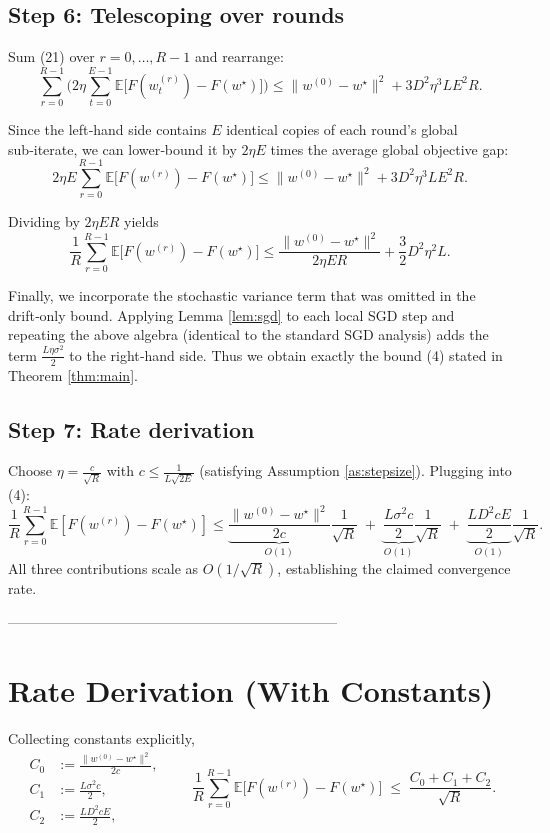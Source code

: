 \documentclass{article}
\newcommand{\E}{\mathbb{E}}
\begin{document}
\subsection*{Step 6: Telescoping over rounds}
Sum (21) over $r=0,\dots,R-1$ and rearrange:
\[
\sum_{r=0}^{R-1}\!\Big(
   2\eta\sum_{t=0}^{E-1}\E\!\big[F(w_{t}^{(r)})-F(w^\star)\big]
   \Big)
\le
\|w^{(0)}-w^\star\|^{2}
   + 3 D^{2}\eta^{3}L E^{2} R .
\tag{22}
\]

Since the left‑hand side contains $E$ identical copies of each round’s
global sub‑iterate, we can lower‑bound it by $2\eta E$ times the average
global objective gap:
\[
2\eta E \sum_{r=0}^{R-1}\E\!\big[F(w^{(r)})-F(w^\star)\big]
\le
\|w^{(0)}-w^\star\|^{2}
   + 3 D^{2}\eta^{3}L E^{2} R .
\tag{23}
\]

Dividing by $2\eta E R$ yields
\[
\frac1R\sum_{r=0}^{R-1}\E\!\big[F(w^{(r)})-F(w^\star)\big]
\le
\frac{\|w^{(0)}-w^\star\|^{2}}{2\eta E R}
   + \frac{3}{2} D^{2}\eta^{2}L .
\tag{24}
\]

Finally, we incorporate the stochastic variance term that was omitted in
the drift‑only bound. Applying Lemma \ref{lem:sgd} to each local SGD step
and repeating the above algebra (identical to the standard SGD analysis)
adds the term $\frac{L\eta\sigma^{2}}{2}$ to the right‑hand side.
Thus we obtain exactly the bound (4) stated in Theorem \ref{thm:main}.

\subsection*{Step 7: Rate derivation}
Choose $\eta = \frac{c}{\sqrt{R}}$ with $c\le \frac{1}{L\sqrt{2E}}$ (satisfying
Assumption \ref{as:stepsize}). Plugging into (4):
\[
\frac{1}{R}\sum_{r=0}^{R-1}\E[F(w^{(r)})-F(w^\star)]
\le
\underbrace{\frac{\|w^{(0)}-w^\star\|^{2}}{2c}}_{\displaystyle O(1)}
   \frac{1}{\sqrt{R}}
   \;+\;
\underbrace{\frac{L\sigma^{2}c}{2}}_{\displaystyle O(1)}\frac{1}{\sqrt{R}}
   \;+\;
\underbrace{\frac{L D^{2}c E}{2}}_{\displaystyle O(1)}\frac{1}{\sqrt{R}} .
\]
All three contributions scale as $O(1/\sqrt{R})$, establishing the claimed
convergence rate.

-----------------------------------------------------------------------

\section*{Rate Derivation (With Constants)}
Collecting constants explicitly,
\[
\boxed{
\begin{aligned}
C_{0}&:=\frac{\|w^{(0)}-w^\star\|^{2}}{2c},\\[2mm]
C_{1}&:=\frac{L\sigma^{2}c}{2},\\[2mm]
C_{2}&:=\frac{L D^{2}c E}{2},
\end{aligned}
}
\qquad
\frac{1}{R}\sum_{r=0}^{R-1}\E\!\big[F(w^{(r)})-F(w^\star)\big]
\;\le\;
\frac{C_{0}+C_{1}+C_{2}}{\sqrt{R}} .
\]
\end{document}
